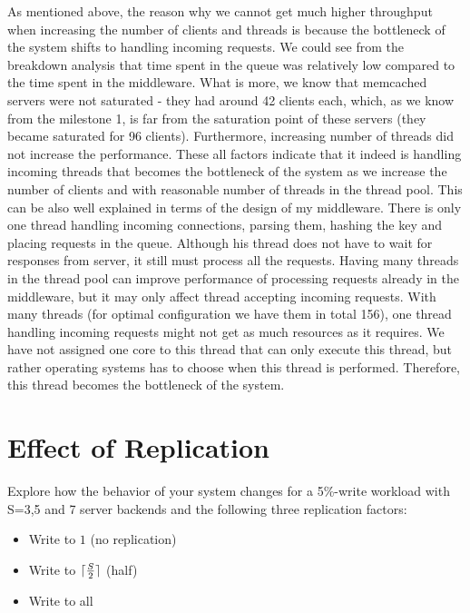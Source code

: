 \documentclass[11pt]{article}
\DeclarePairedDelimiter{\ceil}{\lceil}{\rceil}
\begin{document}
As mentioned above, the reason why we cannot get much higher throughput when increasing the number of clients and threads is because the bottleneck of the system shifts to handling incoming requests. We could see from the breakdown analysis that time spent in the queue was relatively low compared to the time spent in the middleware. What is more, we know that memcached servers were not saturated - they had around 42 clients each, which, as we know from the milestone 1, is far from the saturation point of these servers (they became saturated for 96 clients). Furthermore, increasing number of threads did not increase the performance. These all factors indicate that it indeed is handling incoming threads that becomes the bottleneck of the system as we increase the number of clients and with reasonable number of threads in the thread pool. This can be also well explained in terms of the design of my middleware. There is only one thread handling incoming connections, parsing them, hashing the key and placing requests in the queue. Although his thread does not have to wait for responses from server, it still must process all the requests. Having many threads in the thread pool can improve performance of processing requests already in the middleware, but it may only affect thread accepting incoming requests. With many threads (for optimal configuration we have them in total 156), one thread handling incoming requests might not get as much resources as it requires. We have not assigned one core to this thread that can only execute this thread, but rather operating systems has to choose when this thread is performed. Therefore, this thread becomes the bottleneck of the system. 


\clearpage


\section{Effect of Replication}
\label{sec:replication}

\iffalse
Explore how the behavior of your system changes for a 5\%-write workload with S=3,5 and 7 server backends and the following three replication factors:
\begin{itemize} 
\item Write to $1$ (no replication) 
\item Write to $\ceil{\frac{S}{2}}$ (half) 
\item Write to all 
\end{itemize}
\end{document}
